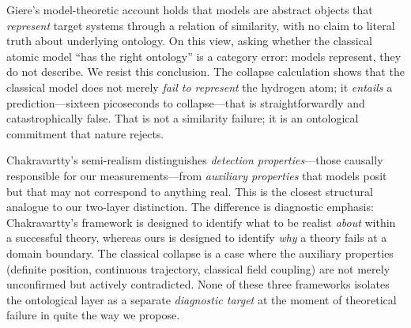 \medskip

Giere's model-theoretic account \cite{giere_1988_science} holds that models are abstract objects that \textit{represent} target systems through a relation of similarity, with no claim to literal truth about underlying ontology. On this view, asking whether the classical atomic model ``has the right ontology'' is a category error: models represent, they do not describe. We resist this conclusion. The collapse calculation shows that the classical model does not merely \textit{fail to represent} the hydrogen atom; it \textit{entails} a prediction---sixteen picoseconds to collapse---that is straightforwardly and catastrophically false. That is not a similarity failure; it is an ontological commitment that nature rejects.

\medskip

Chakravartty's semi-realism \cite{chakravartty_2007_metaphysics} distinguishes \textit{detection properties}---those causally responsible for our measurements---from \textit{auxiliary properties} that models posit but that may not correspond to anything real. This is the closest structural analogue to our two-layer distinction. The difference is diagnostic emphasis: Chakravartty's framework is designed to identify what to be realist \textit{about} within a successful theory, whereas ours is designed to identify \textit{why} a theory fails at a domain boundary. The classical collapse is a case where the auxiliary properties (definite position, continuous trajectory, classical field coupling) are not merely unconfirmed but actively contradicted. None of these three frameworks isolates the ontological layer as a separate \textit{diagnostic target} at the moment of theoretical failure in quite the way we propose.

\medskip

